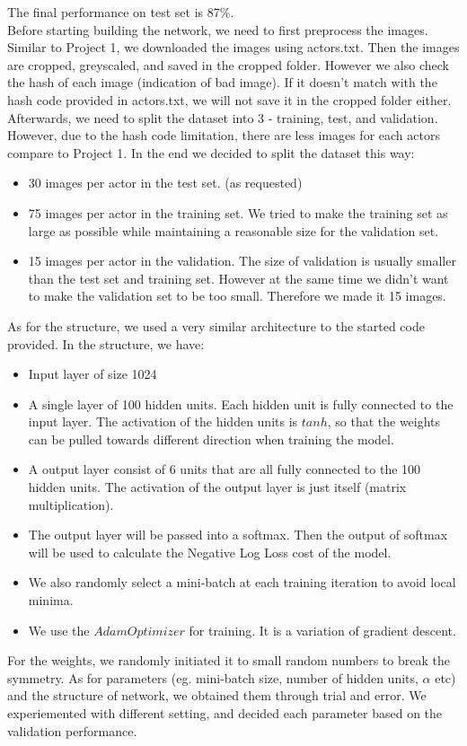 \documentclass[11pt,twoside]{article}
\begin{document}
The final performance on test set is 87\%.\\
Before starting building the network, we need to first preprocess the images. Similar to Project 1, we downloaded the images using actors.txt. Then the images are cropped, greyscaled, and saved in the cropped folder. However we also check the hash of each image (indication of bad image). If it doesn't match with the hash code provided in actors.txt, we will not save it in the cropped folder either.
Afterwards, we need to split the dataset into 3 - training, test, and validation. However, due to the hash code limitation, there are less images for each actors compare to Project 1. In the end we decided to split the dataset this way:
\begin {itemize}
	\item 30 images per actor in the test set. (as requested)
	\item 75 images per actor in the training set. We tried to make the training set as large as possible while maintaining a reasonable size for the validation set.
	\item 15 images per actor in the validation. The size of validation is usually smaller than the test set and training set. However at the same time we didn't want to make the validation set to be too small. Therefore we made it 15 images.
\end {itemize}
As for the structure, we used a very similar architecture to the started code provided. In the structure, we have:
\begin {itemize}
	\item Input layer of size 1024
	\item A single layer of 100 hidden units. Each hidden unit is fully connected to the input layer. The activation of the hidden units is $tanh$, so that the weights can be pulled towards different direction when training the model.
	\item A output layer consist of 6 units that are all fully connected to the 100 hidden units. The activation of the output layer is just itself (matrix multiplication).
	\item The output layer will be passed into a softmax. Then the output of softmax will be used to calculate the Negative Log Loss cost of the model.
	\item We also randomly select a mini-batch at each training iteration to avoid local minima.
	\item We use the $Adam Optimizer$ for training. It is a variation of gradient descent.
\end {itemize}
For the weights, we randomly initiated it to small random numbers to break the symmetry.
As for parameters (eg. mini-batch size, number of hidden units, $\alpha$ etc) and the structure of network, we obtained them through trial and error. We experiemented with different setting, and decided each parameter based on the validation performance.
\end{document}
